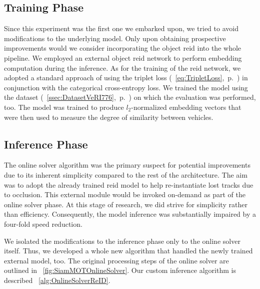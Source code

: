\subsection{Training Phase}

Since this experiment was the first one we embarked upon, we tried to avoid modifications to the underlying model. Only upon obtaining prospective improvements would we consider incorporating the object \gls{reid} into the whole pipeline. We employed an external object \gls{reid} network to perform embedding computation during the inference. As for the training of the \gls{reid} network, we adopted a standard approach of using the triplet loss (\eqtext{}~\ref{eq:TripletLoss},~p.~\pageref{eq:TripletLoss}) in conjunction with the categorical cross-entropy loss. We trained the model using the \verisss{} dataset (\sectiontext{}~\ref{ssec:DatasetVeRI776},~p.~\pageref{ssec:DatasetVeRI776}) on which the evaluation was performed, too. The model was trained to produce $l_2$-normalized embedding vectors that were then used to measure the degree of similarity between vehicles.

\subsection{Inference Phase}
\label{ssec:SiamMOTAndReIDInference}

The online solver algorithm was the primary suspect for potential improvements due to its inherent simplicity compared to the rest of the architecture. The aim was to adopt the already trained \gls{reid} model to help re-instantiate lost tracks due to occlusion. This external module would be invoked on-demand as part of the online solver phase. At this stage of research, we did strive for simplicity rather than efficiency. Consequently, the model inference was substantially impaired by a four-fold speed reduction.

We isolated the modifications to the inference phase only to the online solver itself. Thus, we developed a whole new algorithm that handled the newly trained external model, too. The original processing steps of the online solver are outlined in \figtext{}~\ref{fig:SiamMOTOnlineSolver}. Our custom inference algorithm is described \algtext{}~\ref{alg:OnlineSolverReID}.

